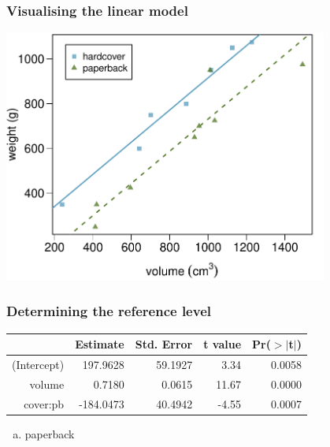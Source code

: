 \begin{frame}
\frametitle{Visualising the linear model}

\begin{center}
\includegraphics[width=0.8\textwidth]{8-1_intro_mlr/figures/books/weight_volume_cover_lines}
\end{center}

\end{frame}


\begin{frame}
\frametitle{Determining the reference level}


{\small
\begin{center}
\begin{tabular}{rrrrr}
  \hline
 & Estimate & Std. Error & t value & Pr($>$$|$t$|$) \\ 
  \hline
(Intercept) & 197.9628 & 59.1927 & 3.34 & 0.0058 \\ 
  volume & 0.7180 & 0.0615 & 11.67 & 0.0000 \\ 
  cover:pb & -184.0473 & 40.4942 & -4.55 & 0.0007 \\ 
   \hline
\end{tabular}
\end{center}
}

\begin{enumerate}[(a)]
\item paperback
\end{enumerate}

\end{frame}

